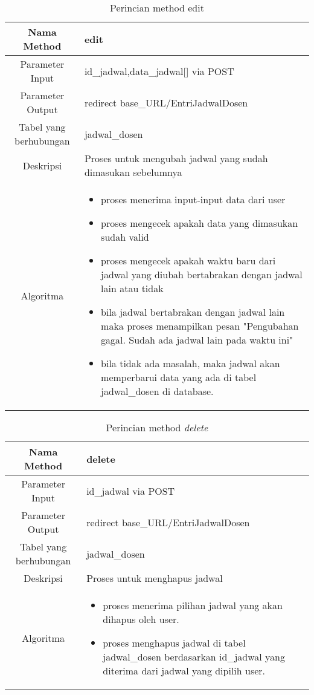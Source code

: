 \begin{center}
\begin{table}[H]
\caption{Perincian method edit}
\begin{tabular}{|c|p{11cm}|}
\hline
Nama Method 	& 	edit 	\\
\hline
Parameter Input & id\_jadwal,data\_jadwal[] via POST \\
\hline
Parameter Output & redirect base\_URL/EntriJadwalDosen \\
\hline
Tabel yang berhubungan & jadwal\_dosen \\
\hline
Deskripsi	& Proses untuk mengubah jadwal yang sudah dimasukan sebelumnya \\
\hline
Algoritma	& \begin{itemize}
				\item proses menerima input-input data dari user
				\item proses mengecek apakah data yang dimasukan sudah valid
				\item proses mengecek apakah waktu baru dari jadwal yang diubah bertabrakan dengan jadwal lain atau tidak
				\item bila jadwal bertabrakan dengan jadwal lain maka proses menampilkan pesan "Pengubahan gagal. Sudah ada jadwal lain pada waktu ini"
				\item bila tidak ada masalah, maka jadwal akan memperbarui data yang ada di tabel jadwal\_dosen di database.
				\end{itemize} \\
\hline
\end{tabular}
\end{table}
\end{center}

\begin{center}
\begin{table}[H]
\caption{Perincian method \textit{delete}}
\begin{tabular}{|c|p{11cm}|}
\hline
Nama Method 	& 	delete 	\\
\hline
Parameter Input & id\_jadwal via POST \\
\hline
Parameter Output & redirect base\_URL/EntriJadwalDosen \\
\hline
Tabel yang berhubungan & jadwal\_dosen \\
\hline
Deskripsi	& Proses untuk menghapus jadwal \\
\hline
Algoritma	& \begin{itemize}
				\item proses menerima pilihan jadwal yang akan dihapus oleh user.
				\item proses menghapus jadwal di tabel jadwal\_dosen berdasarkan id\_jadwal yang diterima dari jadwal yang dipilih user.
				\end{itemize} \\
\hline
\end{tabular}
\end{table}
\end{center}


